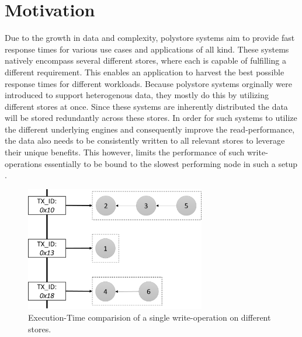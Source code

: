 
\section{Motivation}

Due to the growth in data and complexity, polystore systems aim to provide fast response times for various use cases and applications of all kind.
These systems natively encompass several different stores, where each is capable of fulfilling a different requirement. 
This enables an application to harvest the best possible response times for different workloads.
Because polystore systems orginally were introduced to support heterogenous data, they mostly do this by utilizing different stores at once.
Since these systems are inherently distributed the data will be stored redundantly across these stores. 
In order for such systems to utilize the different underlying engines and consequently improve the read-performance, 
the data also needs to be consistently written to all relevant stores to leverage their unique benefits.
This however, limits the performance of such write-operations essentially to be bound to the slowest performing node in such a setup .

\begin{figure}[t] 
    \centering 
    \includegraphics[width=0.7\textwidth]{Figures/store_comparision.png}
    \caption{Execution-Time comparision of a single write-operation on different stores.}
    \label{fig:store_comparision}
\end{figure}

